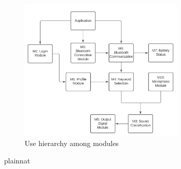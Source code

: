 \documentclass[12pt, titlepage]{article}
\begin{document}
\begin{figure}[H]
\centering
\includegraphics[width=0.7\textwidth]{UsesHierarchy.png}
\caption{Use hierarchy among modules}
\label{FigUH}
\end{figure}




 {plainnat}


\newpage{}
\end{document}
